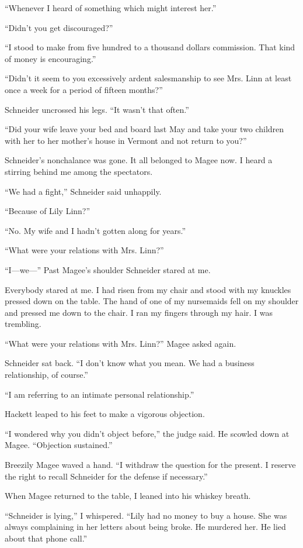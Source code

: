 \documentclass{novel}
\begin{document}
“Whenever I heard of something which might interest her.”

“Didn’t you get discouraged?”

“I stood to make from five hundred to a thousand dollars commission. That kind of money is encouraging.”

“Didn’t it seem to you excessively ardent salesmanship to see Mrs. Linn at least once a week for a period of fifteen months?”

Schneider uncrossed his legs. “It wasn’t that often.”

“Did your wife leave your bed and board last May and take your two children with her to her mother’s house in Vermont and not return to you?”

Schneider’s nonchalance was gone. It all belonged to Magee now. I heard a stirring behind me among the spectators.

“We had a fight,” Schneider said unhappily.

“Because of Lily Linn?”

“No. My wife and I hadn’t gotten along for years.”

“What were your relations with Mrs. Linn?”

“I—we—” Past Magee’s shoulder Schneider stared at me.

Everybody stared at me. I had risen from my chair and stood with my knuckles pressed down on the table. The hand of one of my nursemaids fell on my shoulder and pressed me down to the chair. I ran my fingers through my hair. I was trembling.

“What were your relations with Mrs. Linn?” Magee asked again.

Schneider sat back. “I don’t know what you mean. We had a business relationship, of course.”

“I am referring to an intimate personal relationship.”

Hackett leaped to his feet to make a vigorous objection.

“I wondered why you didn’t object before,” the judge said. He scowled down at Magee. “Objection sustained.”

Breezily Magee waved a hand. “I withdraw the question for the present. I reserve the right to recall Schneider for the defense if necessary.”

When Magee returned to the table, I leaned into his whiskey breath. 

“Schneider is lying,” I whispered. “Lily had no money to buy a house. She was always complaining in her letters about being broke. He murdered her. He lied about that phone call.”
\end{document}
